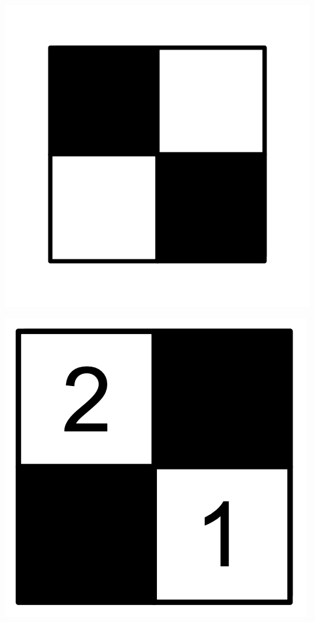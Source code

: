 \documentclass{book}
\theoremstyle{definition}
\begin{document}
\begin{center}
\includegraphics[scale=1]{eckmanhilton2.png}
\end{center}

\begin{center}
\includegraphics[scale=1]{r1.png}
\end{center}
\end{document}
